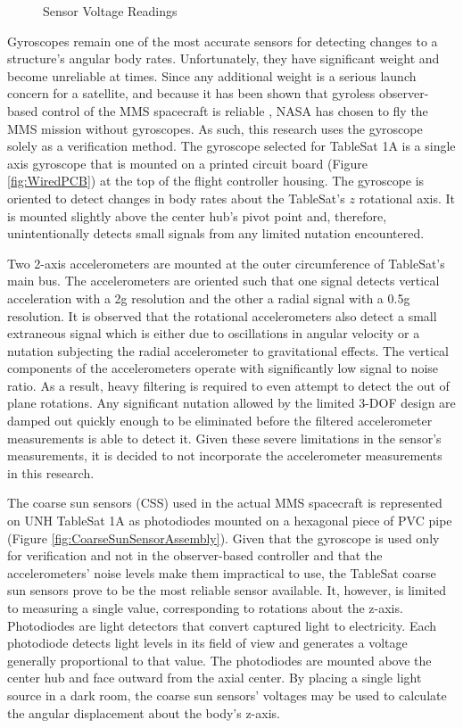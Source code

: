 \begin{figure}[H]
  \centerline{}
  \caption{Sensor Voltage Readings}
  \label{fig:SensorVoltageReadings}
\end{figure}

Gyroscopes remain one of the most accurate sensors for detecting changes to a structure's angular body rates.  Unfortunately, they have significant weight and become unreliable at times.  Since any additional weight is a serious launch concern for a satellite, and because it has been shown that gyroless observer-based control of the MMS spacecraft is reliable \cite{mushawehthesis}, NASA has chosen to fly the MMS mission without gyroscopes.  As such, this research uses the gyroscope solely as a verification method.  The gyroscope selected for TableSat 1A is a single axis gyroscope that is mounted on a printed circuit board (Figure \ref{fig:WiredPCB}) at the top of the flight controller housing.  The gyroscope is oriented to detect changes in body rates about the TableSat's $z$ rotational axis.  It is mounted slightly above the center hub's pivot point and, therefore, unintentionally detects small signals from any limited nutation encountered.

Two 2-axis accelerometers are mounted at the outer circumference of TableSat's main bus.  The accelerometers are oriented such that one signal detects vertical acceleration with a 2g resolution and the other a radial signal with a 0.5g resolution.  It is observed that the rotational accelerometers also detect a small extraneous signal which is either due to oscillations in angular velocity or a nutation subjecting the radial accelerometer to gravitational effects.  The vertical components of the accelerometers operate with significantly low signal to noise ratio.  As a result, heavy filtering is required to even attempt to detect the out of plane rotations.  Any significant nutation allowed by the limited 3-DOF design are damped out quickly enough to be eliminated before the filtered accelerometer measurements is able to detect it.  Given these severe limitations in the sensor's measurements, it is decided to not incorporate the accelerometer measurements in this research.

The coarse sun sensors (CSS) used in the actual MMS spacecraft is represented on UNH TableSat 1A as photodiodes mounted on a hexagonal piece of PVC pipe (Figure \ref{fig:CoarseSunSensorAssembly}).  Given that the gyroscope is used only for verification and not in the observer-based controller and that the accelerometers' noise levels make them impractical to use, the TableSat coarse sun sensors prove to be the most reliable sensor available.  It, however, is limited to measuring a single value, corresponding to rotations about the z-axis.  Photodiodes are light detectors that convert captured light to electricity.  Each photodiode detects light levels in its field of view and generates a voltage generally proportional to that value.  The photodiodes are mounted above the center hub and face outward from the axial center.  By placing a single light source in a dark room, the coarse sun sensors' voltages may be used to calculate the angular displacement about the body's z-axis.

